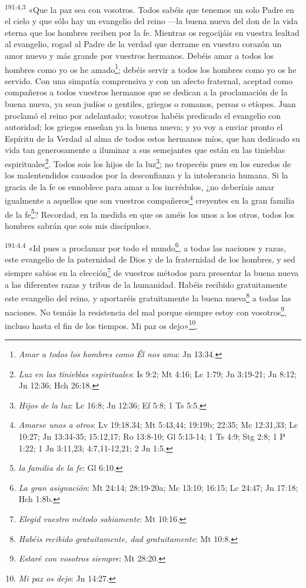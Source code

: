 \par
\textsuperscript{191:4.3} «Que la paz sea con vosotros. Todos sabéis que tenemos un solo Padre en el cielo y que sólo hay un evangelio del reino ---la buena nueva del don de la vida eterna que los hombres reciben por la fe. Mientras os regocijáis en vuestra lealtad al evangelio, rogad al Padre de la verdad que derrame en vuestro corazón un amor nuevo y más grande por vuestros hermanos. Debéis amar a todos los hombres como yo os he amado\footnote{\textit{Amar a todos los hombres como Él nos ama}: Jn 13:34.}; debéis servir a todos los hombres como yo os he servido. Con una simpatía comprensiva y con un afecto fraternal, aceptad como compañeros a todos vuestros hermanos que se dedican a la proclamación de la buena nueva, ya sean judíos o gentiles, griegos o romanos, persas o etíopes. Juan proclamó el reino por adelantado; vosotros habéis predicado el evangelio con autoridad; los griegos enseñan ya la buena nueva; y yo voy a enviar pronto el Espíritu de la Verdad al alma de todos estos hermanos míos, que han dedicado su vida tan generosamente a iluminar a sus semejantes que están en las tinieblas espirituales\footnote{\textit{Luz en las tinieblas espirituales}: Is 9:2; Mt 4:16; Lc 1:79; Jn 3:19-21; Jn 8:12; Jn 12:36; Hch 26:18.}. Todos sois los hijos de la luz\footnote{\textit{Hijos de la luz}: Lc 16:8; Jn 12:36; Ef 5:8; 1 Ts 5:5.}; no tropecéis pues en los enredos de los malentendidos causados por la desconfianza y la intolerancia humana. Si la gracia de la fe os ennoblece para amar a los incrédulos, ¿no deberíais amar igualmente a aquellos que son vuestros compañeros\footnote{\textit{Amarse unos a otros}: Lv 19:18.34; Mt 5:43,44; 19:19b; 22:35; Mc 12:31,33; Lc 10:27; Jn 13:34-35; 15:12,17; Ro 13:8-10; Gl 5:13-14; 1 Ts 4:9; Stg 2:8; 1 P 1:22; 1 Jn 3:11,23; 4:7,11-12,21; 2 Jn 1:5.} creyentes en la gran familia de la fe\footnote{\textit{la familia de la fe}: Gl 6:10.}? Recordad, en la medida en que os améis los unos a los otros, todos los hombres sabrán que sois mis discípulos».

\par
\textsuperscript{191:4.4} «Id pues a proclamar por todo el mundo\footnote{\textit{La gran asignación}: Mt 24:14; 28:19-20a; Mc 13:10; 16:15; Lc 24:47; Jn 17:18; Hch 1:8b.}, a todas las naciones y razas, este evangelio de la paternidad de Dios y de la fraternidad de los hombres, y sed siempre sabios en la elección\footnote{\textit{Elegid vuestro método sabiamente}: Mt 10:16.} de vuestros métodos para presentar la buena nueva a las diferentes razas y tribus de la humanidad. Habéis recibido gratuitamente este evangelio del reino, y aportaréis gratuitamente la buena nueva\footnote{\textit{Habéis recibido gratuitamente, dad gratuitamente}: Mt 10:8.} a todas las naciones. No temáis la resistencia del mal porque siempre estoy con vosotros\footnote{\textit{Estaré con vosotros siempre}: Mt 28:20.}, incluso hasta el fin de los tiempos. Mi paz os dejo»\footnote{\textit{Mi paz os dejo}: Jn 14:27.}.

